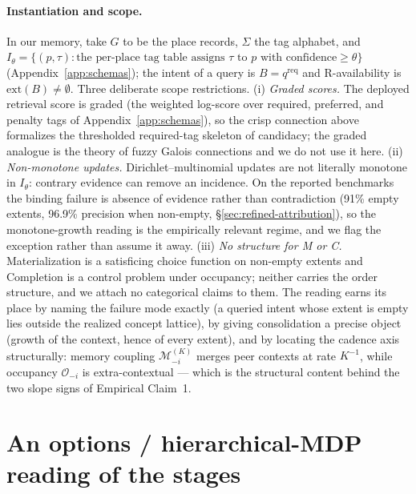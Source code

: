 \documentclass{article}
\begin{document}
\paragraph{Instantiation and scope.}
In our memory, take $G$ to be the place records, $\Sigma$ the tag alphabet, and $I_\theta = \{(p,\tau) : \text{the per-place tag table assigns } \tau \text{ to } p \text{ with confidence} \ge \theta\}$ (Appendix~\ref{app:schemas}); the intent of a query is $B = q^{\mathrm{req}}$ and R-availability is $\mathrm{ext}(B) \ne \emptyset$. Three deliberate scope restrictions. (i) \emph{Graded scores.} The deployed retrieval score is graded (the weighted log-score over required, preferred, and penalty tags of Appendix~\ref{app:schemas}), so the crisp connection above formalizes the thresholded required-tag skeleton of candidacy; the graded analogue is the theory of fuzzy Galois connections \citep{belohlavek1999fuzzy} and we do not use it here. (ii) \emph{Non-monotone updates.} Dirichlet--multinomial updates are not literally monotone in $I_\theta$: contrary evidence can remove an incidence. On the reported benchmarks the binding failure is absence of evidence rather than contradiction (91\% empty extents, 96.9\% precision when non-empty, \S\ref{sec:refined-attribution}), so the monotone-growth reading is the empirically relevant regime, and we flag the exception rather than assume it away. (iii) \emph{No structure for M or C.} Materialization is a satisficing choice function on non-empty extents and Completion is a control problem under occupancy; neither carries the order structure, and we attach no categorical claims to them. The reading earns its place by naming the failure mode exactly (a queried intent whose extent is empty lies outside the realized concept lattice), by giving consolidation a precise object (growth of the context, hence of every extent), and by locating the cadence axis structurally: memory coupling $\mathcal{M}^{(K)}_{-i}$ merges peer contexts at rate $K^{-1}$, while occupancy $\mathcal{O}_{-i}$ is extra-contextual --- which is the structural content behind the two slope signs of Empirical Claim~1.

\section{An options / hierarchical-MDP reading of the stages}
\label{app:hmdp}
\end{document}
